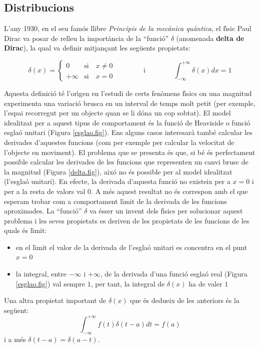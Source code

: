 \documentclass{article}
\begin{document}
 
\subsection{Distribucions}
L'any 1930, en el seu fam\'os llibre {\it Principis de la mec\`anica 
qu\`antica}, el f\'\i sic Paul Dirac va posar de relleu la import\`ancia
de la ``funci\'o'' $\delta$ (anomenada {\bf delta de Dirac}), la qual
va definir mitjan\c{c}ant les seg\"uents propietats:

\[
\delta(x)=
\begin{cases}
0       & \mathrm{si} \quad x \neq 0\\
+\infty & \mathrm{si} \quad x = 0
\end{cases}
\qquad
\qquad
\mathrm{i}
\qquad
\qquad
\int_{-\infty}^{+\infty} \delta(x) dx=1
\]

Aquesta definici\'o t\'e l'or\'\i gen en l'estudi de certs fen\`omens
f\'\i sics on una magnitud experimenta una variaci\'o brusca en un interval
de temps molt petit (per exemple, l'espai recorregut per un objecte
quan se li d\'ona un cop sobtat). 
El model idealitzat per a aquest tipus de comportament
\'es la funci\'o de Heaviside o funci\'o esgla\'o unitari 
(Figura \ref{esglao.fig}). Ens alguns casos interesar\`a tamb\'e calcular
les derivades d'aquestes funcions (com per exemple per calcular la velocitat
de l'objecte en moviment). El problema que se presenta \'es que, si b\'e
\'es perfectament possible calcular les derivades de les funcions que
representen un canvi brusc de la magnitud (Figura \ref{delta.fig}), 
aix\'o no \'es possible per al model idealitzat (l'esgla\'o unitari). 
\newline
En efecte, la derivada d'aquesta funci\'o no existeix per a $x=0$ i per a la
resta de valors val $0$. A m\'es aquest resultat no \'es correspon
amb el que esperam trobar com a comportament l\'\i mit de la derivada
de les funcions aproximades. La ``funci\'o'' $\delta$ va \'esser un 
invent dels f\'\i sics per solucionar aquest problema i les seves 
propietats es deriven de les propietats de les funcions de les quals \'es
l\'\i mit:
\begin{itemize}
\item en el l\'\i mit el valor de la derivada de l'esgla\'o unitari es 
concentra en el punt $x=0$
\item la integral, entre $-\infty$ i $+\infty$, de la derivada d'una funci\'o 
esgla\'o real (Figura \ref{esglao.fig}) val sempre $1$, per tant, la 
integral de $\delta(x)$ ha de valer $1$ 
\end{itemize}
Una altra propietat important de $\delta (x)$ que \'es dedueix de les
anteriors \'es la seg\"uent:
\[
\int_{-\infty}^{+\infty} f(t) \delta(t-a) dt = f(a)
\]
\noindent
i a m\'es $\delta(t-a) = \delta(a-t)$.
\end{document}
